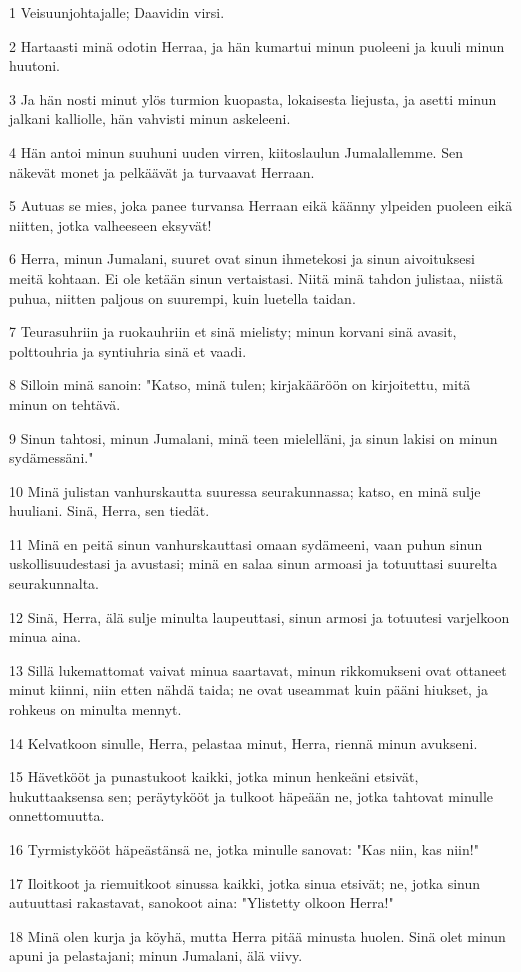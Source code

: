 \par 1 Veisuunjohtajalle; Daavidin virsi.
\par 2 Hartaasti minä odotin Herraa, ja hän kumartui minun puoleeni ja kuuli minun huutoni.
\par 3 Ja hän nosti minut ylös turmion kuopasta, lokaisesta liejusta, ja asetti minun jalkani kalliolle, hän vahvisti minun askeleeni.
\par 4 Hän antoi minun suuhuni uuden virren, kiitoslaulun Jumalallemme. Sen näkevät monet ja pelkäävät ja turvaavat Herraan.
\par 5 Autuas se mies, joka panee turvansa Herraan eikä käänny ylpeiden puoleen eikä niitten, jotka valheeseen eksyvät!
\par 6 Herra, minun Jumalani, suuret ovat sinun ihmetekosi ja sinun aivoituksesi meitä kohtaan. Ei ole ketään sinun vertaistasi. Niitä minä tahdon julistaa, niistä puhua, niitten paljous on suurempi, kuin luetella taidan.
\par 7 Teurasuhriin ja ruokauhriin et sinä mielisty; minun korvani sinä avasit, polttouhria ja syntiuhria sinä et vaadi.
\par 8 Silloin minä sanoin: "Katso, minä tulen; kirjakääröön on kirjoitettu, mitä minun on tehtävä.
\par 9 Sinun tahtosi, minun Jumalani, minä teen mielelläni, ja sinun lakisi on minun sydämessäni."
\par 10 Minä julistan vanhurskautta suuressa seurakunnassa; katso, en minä sulje huuliani. Sinä, Herra, sen tiedät.
\par 11 Minä en peitä sinun vanhurskauttasi omaan sydämeeni, vaan puhun sinun uskollisuudestasi ja avustasi; minä en salaa sinun armoasi ja totuuttasi suurelta seurakunnalta.
\par 12 Sinä, Herra, älä sulje minulta laupeuttasi, sinun armosi ja totuutesi varjelkoon minua aina.
\par 13 Sillä lukemattomat vaivat minua saartavat, minun rikkomukseni ovat ottaneet minut kiinni, niin etten nähdä taida; ne ovat useammat kuin pääni hiukset, ja rohkeus on minulta mennyt.
\par 14 Kelvatkoon sinulle, Herra, pelastaa minut, Herra, riennä minun avukseni.
\par 15 Hävetkööt ja punastukoot kaikki, jotka minun henkeäni etsivät, hukuttaaksensa sen; peräytykööt ja tulkoot häpeään ne, jotka tahtovat minulle onnettomuutta.
\par 16 Tyrmistykööt häpeästänsä ne, jotka minulle sanovat: "Kas niin, kas niin!"
\par 17 Iloitkoot ja riemuitkoot sinussa kaikki, jotka sinua etsivät; ne, jotka sinun autuuttasi rakastavat, sanokoot aina: "Ylistetty olkoon Herra!"
\par 18 Minä olen kurja ja köyhä, mutta Herra pitää minusta huolen. Sinä olet minun apuni ja pelastajani; minun Jumalani, älä viivy.

